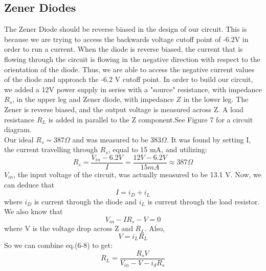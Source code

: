 \documentclass{article}
\begin{document}
\subsection{Zener Diodes}
    The Zener Diode should be reverse biased in the design of our circuit. This is because we are trying to access the backwards voltage cutoff point of -6.2V in order to run a current. When the diode is reverse biased, the current that is flowing through the circuit is flowing in the negative direction with respect to the orientation of the diode. Thus, we are able to access the negative current values of the diode and approach the -6.2 V cutoff point. In order to build our circuit, we added a 12V power supply in series with a "source" resistance, with impedance $R_s$, in the upper leg and Zener diode, with impedance $Z$ in the lower leg. The Zener is reverse biased, and the output voltage is measured across Z. A load resistance $R_L$ is added in parallel to the Z component.See Figure 7 for a circuit diagram.\\\indent Our ideal $R_s = 387\Omega$ and was measured to be $383\Omega$. It was found by setting I, the current travelling through $R_s$, equal to 15 mA, and utilizing:
    \begin{equation}
        R_s = \frac{V_{in} - 6.2V}{I} = \frac{12V - 6.2V}{15 mA} \approx 387 \Omega
    \end{equation}
    $V_{in}$, the input voltage of the circuit, was actually measured to be 13.1 V. Now, we can deduce that 
    \begin{equation}
        I = i_D + i_L
    \end{equation}
    where $i_D$ is current through the diode and $i_L$ is current through the load resistor. We also know that
    \begin{equation}
        V_{in} - IR_s - V = 0
    \end{equation}
    where V is the voltage drop across Z and $R_L$. Also,
    \begin{equation}
        V = i_L R_L
    \end{equation}
    So we can combine eq.(6-8) to get:
    \begin{equation}
        R_L = \frac{R_s V}{V_{in} - V - i_{d} R_s}
    \end{equation}
\end{document}
